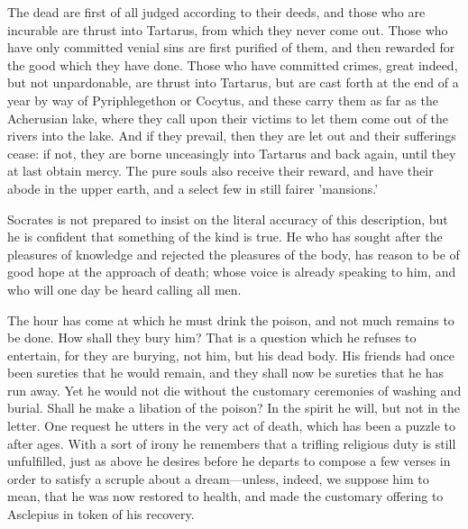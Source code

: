 \documentclass[11pt,letter]{article}
\begin{document}
\par  The dead are first of all judged according to their deeds, and those who are incurable are thrust into Tartarus, from which they never come out. Those who have only committed venial sins are first purified of them, and then rewarded for the good which they have done. Those who have committed crimes, great indeed, but not unpardonable, are thrust into Tartarus, but are cast forth at the end of a year by way of Pyriphlegethon or Cocytus, and these carry them as far as the Acherusian lake, where they call upon their victims to let them come out of the rivers into the lake. And if they prevail, then they are let out and their sufferings cease: if not, they are borne unceasingly into Tartarus and back again, until they at last obtain mercy. The pure souls also receive their reward, and have their abode in the upper earth, and a select few in still fairer 'mansions.'

\par  Socrates is not prepared to insist on the literal accuracy of this description, but he is confident that something of the kind is true. He who has sought after the pleasures of knowledge and rejected the pleasures of the body, has reason to be of good hope at the approach of death; whose voice is already speaking to him, and who will one day be heard calling all men.

\par  The hour has come at which he must drink the poison, and not much remains to be done. How shall they bury him? That is a question which he refuses to entertain, for they are burying, not him, but his dead body. His friends had once been sureties that he would remain, and they shall now be sureties that he has run away. Yet he would not die without the customary ceremonies of washing and burial. Shall he make a libation of the poison? In the spirit he will, but not in the letter. One request he utters in the very act of death, which has been a puzzle to after ages. With a sort of irony he remembers that a trifling religious duty is still unfulfilled, just as above he desires before he departs to compose a few verses in order to satisfy a scruple about a dream—unless, indeed, we suppose him to mean, that he was now restored to health, and made the customary offering to Asclepius in token of his recovery.
\end{document}
